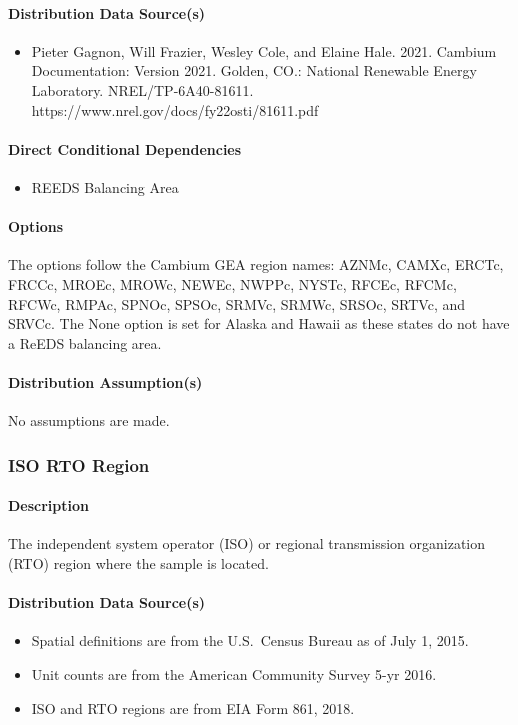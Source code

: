 \paragraph{Distribution Data Source(s)}
\begin{itemize}
    \item Pieter Gagnon, Will Frazier, Wesley Cole, and Elaine Hale. 2021. Cambium Documentation: Version 2021. Golden, CO.: National Renewable Energy Laboratory. NREL/TP-6A40-81611. https://www.nrel.gov/docs/fy22osti/81611.pdf
\end{itemize}

\paragraph{Direct Conditional Dependencies}
\begin{itemize}
    \item REEDS Balancing Area
\end{itemize}

\paragraph{Options}
The options follow the Cambium GEA region names: AZNMc, CAMXc, ERCTc, FRCCc, MROEc, MROWc, NEWEc, NWPPc, NYSTc, RFCEc, RFCMc, RFCWc, RMPAc, SPNOc, SPSOc, SRMVc, SRMWc, SRSOc, SRTVc, and SRVCc. The None option is set for Alaska and Hawaii as these states do not have a ReEDS balancing area.

\paragraph{Distribution Assumption(s)}
No assumptions are made.

\subsubsection{ISO RTO Region}
\paragraph{Description}
The independent system operator (ISO) or regional transmission organization (RTO) region where the sample is located.

\paragraph{Distribution Data Source(s)}
\begin{itemize}
    \item Spatial definitions are from the U.S.~Census Bureau as of July 1, 2015.
    \item Unit counts are from the American Community Survey 5-yr 2016.
    \item ISO and RTO regions are from EIA Form 861, 2018.
\end{itemize}

